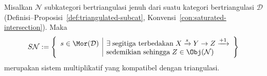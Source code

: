 
\begin{proposisi}
	Misalkan $\mathcal{N}$ subkategori bertriangulasi jenuh dari suatu kategori
	bertriangulasi $\mathcal{D}$ (Definisi--Proposisi~\ref{def:triangulated-subcat},
	Konvensi~\ref{con:saturated-intersection}). Maka
	\[ S\mathcal{N} := \left\{\begin{array}{r|l}
		s \in \Mor(\mathcal{D}) & \exists \;\text{segitiga terbedakan}\; X \xrightarrow{s} Y \to Z \xrightarrow{+1} \\
		& \text{sedemikian sehingga}\; Z \in \Obj(\mathcal{N})
	\end{array}\right\} \]
	merupakan sistem multiplikatif yang kompatibel dengan triangulasi.
\end{proposisi}

